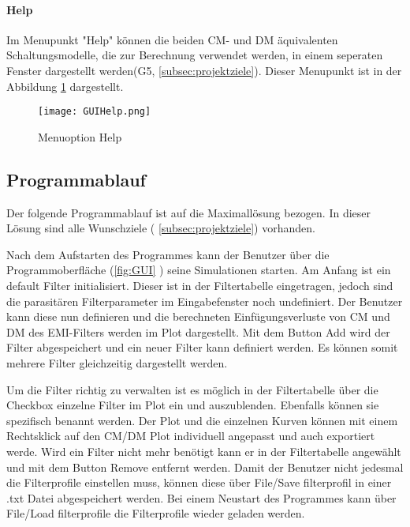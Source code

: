 \paragraph{Help} \label{para:Help}
Im Menupunkt "Help" können die beiden CM- und DM äquivalenten Schaltungsmodelle, die zur Berechnung verwendet werden, in einem seperaten Fenster dargestellt werden(G5,  \ref{subsec:projektziele}). Dieser Menupunkt ist in der Abbildung \ref{fig:GUIHelp}  dargestellt.

\begin{figure}[H]
	\centering
	\texttt{[image: GUIHelp.png]}
	\caption{Menuoption Help}
	\label{fig:GUIHelp}
\end{figure}


\newpage

\subsection{Programmablauf} \label{subsec:programmablauf}

Der folgende Programmablauf ist auf die Maximallösung bezogen. In dieser Lösung sind alle Wunschziele ( \ref{subsec:projektziele}) vorhanden.

Nach dem Aufstarten des Programmes kann der Benutzer über die Programmoberfläche (\ref{fig:GUI} ) seine Simulationen starten.
Am Anfang ist ein default Filter initialisiert. Dieser ist in der Filtertabelle eingetragen, jedoch sind die parasitären Filterparameter im Eingabefenster noch undefiniert. Der Benutzer kann diese nun definieren und die berechneten Einfügungsverluste von CM und DM des EMI-Filters werden im Plot dargestellt. Mit dem Button Add wird der Filter abgespeichert und ein neuer Filter kann definiert werden. Es können somit mehrere Filter gleichzeitig dargestellt werden. 

Um die Filter richtig zu verwalten ist es möglich in der Filtertabelle über die Checkbox einzelne Filter im Plot ein und auszublenden. Ebenfalls können sie spezifisch benannt werden. Der Plot und die einzelnen Kurven können mit einem Rechtsklick auf den CM/DM Plot individuell angepasst und auch exportiert werde. Wird ein Filter nicht mehr benötigt kann er in der Filtertabelle angewählt und mit dem Button Remove entfernt werden. Damit der Benutzer nicht jedesmal die Filterprofile einstellen muss, können diese über File/Save filterprofil in einer .txt Datei abgespeichert werden. Bei einem Neustart des Programmes kann über File/Load filterprofile die Filterprofile wieder geladen werden. 

